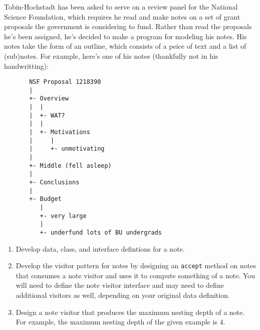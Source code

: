 \documentclass[12pt]{article}                   %
\def\pts#1{\marginpar{\footnotesize \raggedright  \fbox{#1 {\sc Points}}}}
\begin{document}
\ifrubric
\else
{}
\fi
\newpage


\begin{problem} \pts{25}
\noindent
Tobin-Hochstadt has been asked to serve on a review panel for the
 National Science Foundation, which requires he read and make notes on
 a set of grant proposals the government is considering to fund.
  Rather than read the proposals he's been assigned, he's decided to
 make a program for modeling his notes.  His notes take the form of an
 outline, which consists of a peice of text and a list of (sub)notes.
  For example, here's one of his notes (thankfully not in his
 handwritting):
\begin{verbatim}
       NSF Proposal 1218390
       |
       +- Overview
       |  |
       |  +- WAT?
       |  |
       |  +- Motivations
       |     |
       |     +- unmotivating
       |
       +- Middle (fell asleep)
       |
       +- Conclusions
       |
       +- Budget
          |
          +- very large
          |
          +- underfund lots of BU undergrads
\end{verbatim}


\newpage

\begin{enumerate}

\item Develop data, class, and interface defintions for a note.

\newpage

\noindent
\item Develop the visitor pattern for notes by designing
  an \texttt{accept} method on notes that
  consumes a note visitor and uses it to compute something of a note.
  You will need to define the note visitor interface and may need to
  define additional visitors as well, depending on your original data
  definition.

\newpage

\noindent
\item Design a note visitor that produces the maximum nesting depth of
  a note.  For example, the maximum nesting depth of the given example
  is 4.




\end{enumerate}
\end{problem}
\end{document}
